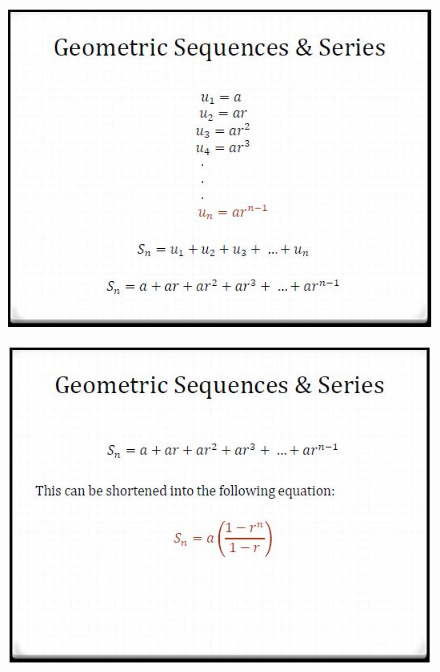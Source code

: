 \documentclass{beamer}
\begin{document}
\begin{frame}
	\begin{figure}
		\centering
		\includegraphics[width=0.99\linewidth]{SeqSer19A}
	\end{figure}
	
\end{frame}	
\begin{frame}
	\begin{figure}
		\centering
		\includegraphics[width=0.99\linewidth]{SeqSer19B}
	\end{figure}
	
\end{frame}
\end{document}
